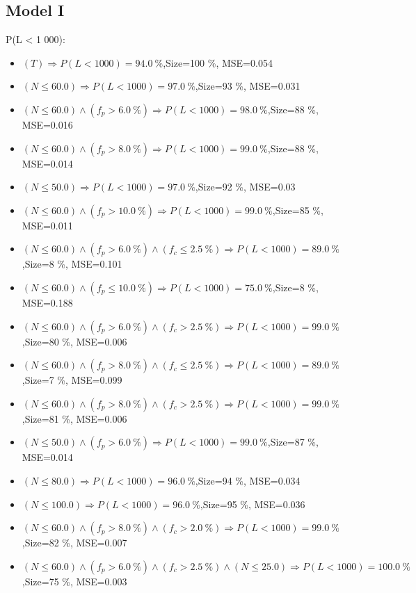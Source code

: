 \documentclass[numbered]{CSL}
\begin{document}
\subsection{Model I}
P(L < 1 000):
\begin{itemize}
\item $(T) \Rightarrow P(L < 1 000) = 94.0~\%$,\hfill Size=100 \%, MSE=0.054
\item $(N \leq 60.0) \Rightarrow P(L < 1 000) = 97.0~\%$,\hfill Size=93 \%, MSE=0.031
\item $(N \leq 60.0) \land (f_p > 6.0~\%) \Rightarrow P(L < 1 000) = 98.0~\%$,\hfill Size=88 \%, MSE=0.016
\item $(N \leq 60.0) \land (f_p > 8.0~\%) \Rightarrow P(L < 1 000) = 99.0~\%$,\hfill Size=88 \%, MSE=0.014
\item $(N \leq 50.0) \Rightarrow P(L < 1 000) = 97.0~\%$,\hfill Size=92 \%, MSE=0.03
\item $(N \leq 60.0) \land (f_p > 10.0~\%) \Rightarrow P(L < 1 000) = 99.0~\%$,\hfill Size=85 \%, MSE=0.011
\item $(N \leq 60.0) \land (f_p > 6.0~\%) \land (f_c \leq 2.5~\%) \Rightarrow P(L < 1 000) = 89.0~\%$,\hfill Size=8 \%, MSE=0.101
\item $(N \leq 60.0) \land (f_p \leq 10.0~\%) \Rightarrow P(L < 1 000) = 75.0~\%$,\hfill Size=8 \%, MSE=0.188
\item $(N \leq 60.0) \land (f_p > 6.0~\%) \land (f_c > 2.5~\%) \Rightarrow P(L < 1 000) = 99.0~\%$,\hfill Size=80 \%, MSE=0.006
\item $(N \leq 60.0) \land (f_p > 8.0~\%) \land (f_c \leq 2.5~\%) \Rightarrow P(L < 1 000) = 89.0~\%$,\hfill Size=7 \%, MSE=0.099
\item $(N \leq 60.0) \land (f_p > 8.0~\%) \land (f_c > 2.5~\%) \Rightarrow P(L < 1 000) = 99.0~\%$,\hfill Size=81 \%, MSE=0.006
\item $(N \leq 50.0) \land (f_p > 6.0~\%) \Rightarrow P(L < 1 000) = 99.0~\%$,\hfill Size=87 \%, MSE=0.014
\item $(N \leq 80.0) \Rightarrow P(L < 1 000) = 96.0~\%$,\hfill Size=94 \%, MSE=0.034
\item $(N \leq 100.0) \Rightarrow P(L < 1 000) = 96.0~\%$,\hfill Size=95 \%, MSE=0.036
\item $(N \leq 60.0) \land (f_p > 8.0~\%) \land (f_c > 2.0~\%) \Rightarrow P(L < 1 000) = 99.0~\%$,\hfill Size=82 \%, MSE=0.007
\item $(N \leq 60.0) \land (f_p > 6.0~\%) \land (f_c > 2.5~\%) \land (N \leq 25.0) \Rightarrow P(L < 1 000) = 100.0~\%$,\hfill Size=75 \%, MSE=0.003

\end{itemize}
\end{document}
